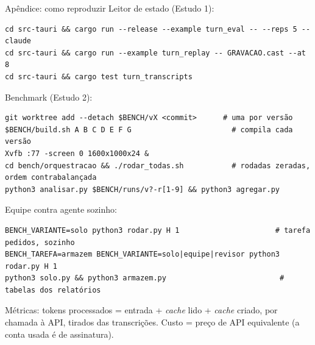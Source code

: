\documentclass[11pt,aspectratio=169]{beamer}
\begin{document}
\appendix

\begin{frame}[fragile]{Apêndice: como reproduzir}
\footnotesize
\lstset{basicstyle=\ttfamily\tiny}
Leitor de estado (Estudo 1):
\begin{lstlisting}
cd src-tauri && cargo run --release --example turn_eval -- --reps 5 --claude
cd src-tauri && cargo run --example turn_replay -- GRAVACAO.cast --at 8
cd src-tauri && cargo test turn_transcripts
\end{lstlisting}
Benchmark (Estudo 2):
\begin{lstlisting}
git worktree add --detach $BENCH/vX <commit>      # uma por versão
$BENCH/build.sh A B C D E F G                       # compila cada versão
Xvfb :77 -screen 0 1600x1000x24 &
cd bench/orquestracao && ./rodar_todas.sh           # rodadas zeradas, ordem contrabalançada
python3 analisar.py $BENCH/runs/v?-r[1-9] && python3 agregar.py
\end{lstlisting}
Equipe contra agente sozinho:
\begin{lstlisting}
BENCH_VARIANTE=solo python3 rodar.py H 1                      # tarefa pedidos, sozinho
BENCH_TAREFA=armazem BENCH_VARIANTE=solo|equipe|revisor python3 rodar.py H 1
python3 solo.py && python3 armazem.py                          # tabelas dos relatórios
\end{lstlisting}
Métricas: tokens processados = entrada + \emph{cache} lido + \emph{cache} criado, por chamada à API, tirados das
transcrições. Custo = preço de API equivalente (a conta usada é de assinatura).
\end{frame}
\end{document}
